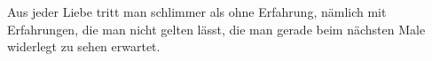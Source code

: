 Aus jeder Liebe tritt man schlimmer als ohne Erfahrung, nämlich mit Erfahrungen, die man nicht gelten lässt, die man gerade beim nächsten Male widerlegt zu sehen erwartet.
\par

